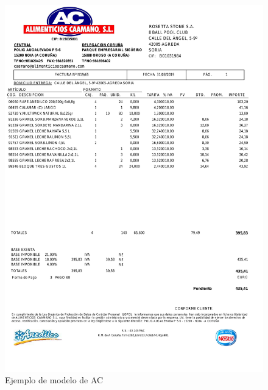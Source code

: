 \begin{figure}[hp!]
	\centering
	\includegraphics[angle=0,height=1.4\textwidth]{imaxes/z-adicional/modelo-ac}
	\caption{Ejemplo de modelo de AC}
	\label{fig:modelo-ac}
\end{figure}